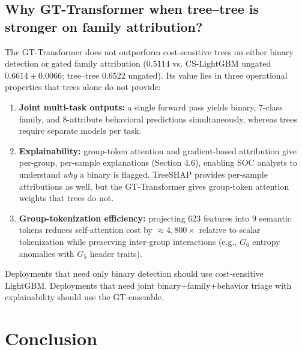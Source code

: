 \documentclass[Number]{sn-jnl}
\begin{document}
\subsection*{Why GT-Transformer when tree--tree is stronger on family attribution?}\label{subsec:gt_value}
The GT-Transformer does not outperform cost-sensitive trees on either binary detection or gated family attribution ($0.5114$ vs. CS-LightGBM ungated $0.6614\pm0.0066$; tree--tree $0.6522$ ungated). Its value lies in three operational properties that trees alone do not provide:
\begin{enumerate}[leftmargin=*]
\item \textbf{Joint multi-task outputs:} a single forward pass yields binary, 7-class family, and 8-attribute behavioral predictions simultaneously, whereas trees require separate models per task.
\item \textbf{Explainability:} group-token attention and gradient-based attribution give per-group, per-sample explanations (Section 4.6), enabling SOC analysts to understand \emph{why} a binary is flagged. TreeSHAP provides per-sample attributions as well, but the GT-Transformer gives group-token attention weights that trees do not.
\item \textbf{Group-tokenization efficiency:} projecting 623 features into 9 semantic tokens reduces self-attention cost by $\approx4{,}800\times$ relative to scalar tokenization while preserving inter-group interactions (e.g., $G_6$ entropy anomalies with $G_5$ header traits).
\end{enumerate}
Deployments that need only binary detection should use cost-sensitive LightGBM. Deployments that need joint binary+family+behavior triage with explainability should use the GT-ensemble.

\section{Conclusion}\label{sec:conclusion}
\end{document}
